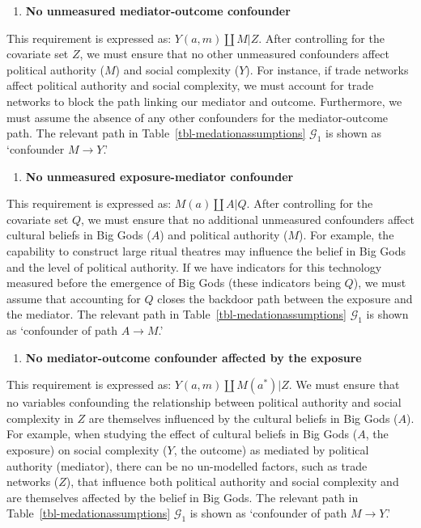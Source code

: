 \documentclass[
  single column]{article}
\providecommand{\tightlist}{%
  \setlength{\itemsep}{0pt}\setlength{\parskip}{0pt}}\usepackage{longtable,booktabs,array}
\begin{document}
\begin{enumerate}
\def\labelenumi{\arabic{enumi}.}
\setcounter{enumi}{1}
\tightlist
\item
  \textbf{No unmeasured mediator-outcome confounder}
\end{enumerate}

This requirement is expressed as: \(Y(a,m) \coprod M | Z\). After
controlling for the covariate set \(Z\), we must ensure that no other
unmeasured confounders affect political authority (\(M\)) and social
complexity (\(Y\)). For instance, if trade networks affect political
authority and social complexity, we must account for trade networks to
block the path linking our mediator and outcome. Furthermore, we must
assume the absence of any other confounders for the mediator-outcome
path. The relevant path in Table~\ref{tbl-medationassumptions}
\(\mathcal{G}_1\) is shown as `confounder \(M \to Y\).'

\begin{enumerate}
\def\labelenumi{\arabic{enumi}.}
\setcounter{enumi}{2}
\tightlist
\item
  \textbf{No unmeasured exposure-mediator confounder}
\end{enumerate}

This requirement is expressed as: \(M(a) \coprod A | Q\). After
controlling for the covariate set \(Q\), we must ensure that no
additional unmeasured confounders affect cultural beliefs in Big Gods
(\(A\)) and political authority (\(M\)). For example, the capability to
construct large ritual theatres may influence the belief in Big Gods and
the level of political authority. If we have indicators for this
technology measured before the emergence of Big Gods (these indicators
being \(Q\)), we must assume that accounting for \(Q\) closes the
backdoor path between the exposure and the mediator. The relevant path
in Table~\ref{tbl-medationassumptions} \(\mathcal{G}_1\) is shown as
`confounder of path \(A \to M\).'

\begin{enumerate}
\def\labelenumi{\arabic{enumi}.}
\setcounter{enumi}{3}
\tightlist
\item
  \textbf{No mediator-outcome confounder affected by the exposure}
\end{enumerate}

This requirement is expressed as: \(Y(a,m) \coprod M(a^*) | Z\). We must
ensure that no variables confounding the relationship between political
authority and social complexity in \(Z\) are themselves influenced by
the cultural beliefs in Big Gods (\(A\)). For example, when studying the
effect of cultural beliefs in Big Gods (\(A\), the exposure) on social
complexity (\(Y\), the outcome) as mediated by political authority
(mediator), there can be no un-modelled factors, such as trade networks
(\(Z\)), that influence both political authority and social complexity
and are themselves affected by the belief in Big Gods. The relevant path
in Table~\ref{tbl-medationassumptions} \(\mathcal{G}_1\) is shown as
`confounder of path \(M \to Y\).'
\end{document}
